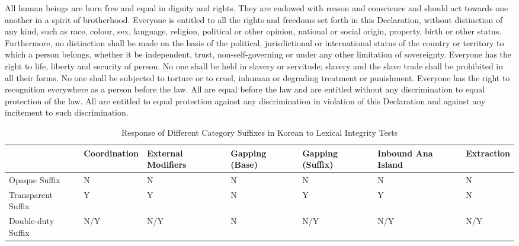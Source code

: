 All human beings are born free and equal in dignity and rights. They are endowed with reason and conscience and should act towards one another in a spirit of brotherhood. Everyone is entitled to all the rights and freedoms set forth in this Declaration, without distinction of any kind, such as race, colour, sex, language, religion, political or other opinion, national or social origin, property, birth or other status. Furthermore, no distinction shall be made on the basis of the political, jurisdictional or international status of the country or territory to which a person belongs, whether it be independent, trust, non-self-governing or under any other limitation of sovereignty. Everyone has the right to life, liberty and security of person. No one shall be held in slavery or servitude; slavery and the slave trade shall be prohibited in all their forms. No one shall be subjected to torture or to cruel, inhuman or degrading treatment or punishment. Everyone has the right to recognition everywhere as a person before the law. All are equal before the law and are entitled without any discrimination to equal protection of the law. All are entitled to equal protection against any discrimination in violation of this Declaration and against any incitement to such discrimination.
\begin{table}[hbt!]
    \caption{Response of Different Category Suffixes in Korean to Lexical Integrity Tests}
    \vspace{10pt}
    \centering
    \begin{tabular}{|p{1.8cm}|p{2.1cm}|p{1.7cm}|p{1.6cm}|p{1.6cm}|p{2cm}|p{1.8cm}|}
    \hline 
                        & Coordination & External Modifiers & Gapping (Base) & Gapping (Suffix) & Inbound Ana Island & Extraction \\ \hline 
    Opaque Suffix       & N             & N                 & N             & N                 & N   & N \\ \hline 
    Transparent Suffix  & Y             & Y                 & N             & Y                 & Y   & N \\ \hline 
    Double-duty Suffix  & N/Y           & N/Y               & N             & N/Y               & N/Y & N/Y \\ \hline 
    \end{tabular}
    \label{tab:korean}
\end{table}

